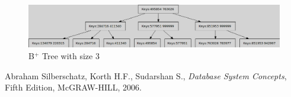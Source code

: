 \documentclass[11pt, oneside, a4paper]{article}
\begin{document}
\begin{figure}[htb]
\begin{center}
\ifpdf
	\includegraphics[scale=0.45]{./bplusSize3.png}
\else
\fi
\caption{B$^+$ Tree with size 3}
\label{fig:5}
\end{center}
\end{figure}

\begin{thebibliography}{10}
 Abraham Silberschatz, Korth H.F., Sudarshan S., \emph{Database System Concepts}, Fifth Edition, McGRAW-HILL, 2006.
\end{thebibliography}
\end{document}
